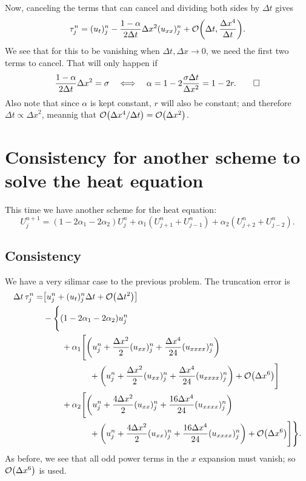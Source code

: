 \documentclass[11pt,letter, swedish, english
]{article}
\newcommand{\Dx}{\ensuremath{\Delta{x}}}
\newcommand{\Dt}{\ensuremath{\Delta{t}}}
\begin{document}
Now, canceling the terms that can cancel and dividing both sides by
$\Dt$ gives
\begin{equation}
\tau_j^n=(u_t)_j^n-\frac{1-\alpha}{2\Dt}\Dx^2(u_{xx})_j^n
+\order{\Dt, \frac{\Dx^4}{\Dt}}.
\end{equation}
We see that for this to be vanishing when $\Dt, \Dx\to0$, we need the
first two terms to cancel. That will only happen if
\begin{equation}
\frac{1-\alpha}{2\Dt}\Dx^2=\sigma
\quad\Longleftrightarrow\quad
\alpha=1-2\frac{\sigma\Dt}{\Dx^2}=1-2r.
\qed
\end{equation}
Also note that since $\alpha$ is kept constant, $r$ will also be
constant; and therefore $\Dt\propto\Dx^2$, meannig that
$\order{\Dx^4/\Dt}=\order{\Dx^2}$.

\section{Consistency for another scheme to solve the heat equation}
This time we have another scheme for the heat equation:
\begin{equation}
U_{j}^{n+1}=(1-2\alpha_1-2\alpha_2)U_{j}^{n}
+\alpha_1(U_{j+1}^n+U_{j-1}^n)+\alpha_2(U_{j+2}^n+U_{j-2}^n).
\end{equation}

\subsection{Consistency}
We have a very silimar case to the previous problem. The truncation
error is
\begin{equation}
\begin{aligned}
\Dt\,\tau_j^n=& \qty[u_j^n+(u_t)_j^n\Dt+\order{\Dt^2}]\\
&-\Bigg\{(1-2\alpha_1-2\alpha_2)u_j^n
\\ &\hspace{22pt}+\alpha_1\Bigg[
\qty(u_j^n+\frac{\Dx^2}{2}(u_{xx})_j^n+\frac{\Dx^4}{24}(u_{xxxx})_j^n)
\\ &\hspace{55pt}
+\qty(u_j^n+\frac{\Dx^2}{2}(u_{xx})_j^n+\frac{\Dx^4}{24}(u_{xxxx})_j^n)
+\order{\Dx^6}\Bigg]
\\ &\hspace{22pt}
+\alpha_2\Bigg[
\qty(u_j^n+\frac{4\Dx^2}{2}(u_{xx})_j^n+\frac{16\Dx^4}{24}(u_{xxxx})_j^n)
\\ &\hspace{55pt}
+\qty(u_j^n+\frac{4\Dx^2}{2}(u_{xx})_j^n+\frac{16\Dx^4}{24}(u_{xxxx})_j^n)
+\order{\Dx^6}\Bigg]
\Bigg\}.
\end{aligned}
\end{equation}
As before, we see that all odd power terms in the $x$ expansion must
vanish; so $\order{\Dx^6}$ is used. 
\end{document}
